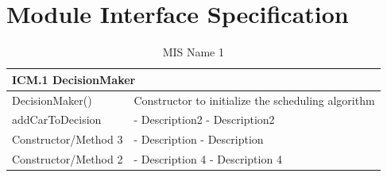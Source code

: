 \documentclass [10pt]{article}
\begin{document}




\section{Module Interface Specification}




\begin{longtable}{| p{ } | p{ } | }\caption{MIS Name 1} \\\hline  
 \multicolumn{2}{|l|}{\textbf {ICM.1 DecisionMaker}}\\ \hline
 
\cellcolor{tableCell}DecisionMaker() & \cellcolor{tableCell}Constructor to initialize the scheduling algorithm \newline\\ \hline 

addCarToDecision& - Description2 \newline - Description2  \\ \hline 

\cellcolor{tableCell}Constructor/Method 3 & \cellcolor{tableCell}- Description \newline - Description  
\\ \hline


Constructor/Method 2 & - Description 4 \newline - Description 4  \\ \hline
\end{longtable}
\end{document}
